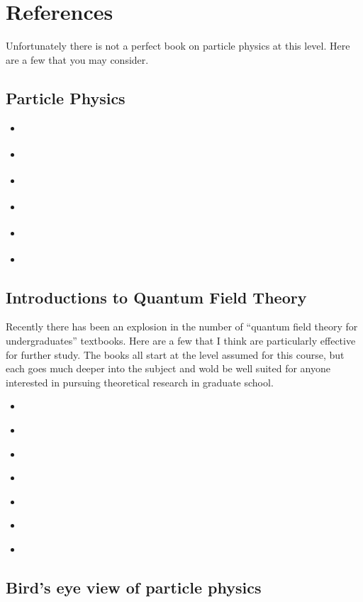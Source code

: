 \documentclass[12pt, oneside]{report}    %
\let\oldsection\section
\def\section{%
  \setcounter{sidenote}{1}%
  \oldsection
}
\begin{document}
\section{References}
Unfortunately there is not a perfect book on particle physics at this level. Here are a few that you may consider. 

\subsection{Particle Physics}
\begin{itemize}
    \item \cite{Griffiths:2008zz}
    \item \cite{Larkoski:2019jnv}
    \item \cite{Peskin:2019iig}
    \item \cite{Cahn:1989by}
    \item \cite{Goldberg:2017dlc}
    \item \cite{Bettini:2008zz}
\end{itemize}

\subsection{Introductions to Quantum Field Theory}
Recently there has been an explosion in the number of ``quantum field theory for undergraduates'' textbooks. Here are a few that I think are particularly effective for further study. The books all start at the level assumed for this course, but each goes much deeper into the subject and wold be well suited for anyone interested in pursuing theoretical research in graduate school.
\begin{itemize}
    \item \cite{Schwichtenberg:2018dri}
    \item \cite{schwichtenberg2020no}
    \item \cite{Lancaster:2014pza}
    \item \cite{donoghue2022prelude}
    \item \cite{Zee:2010qce}
    \item \cite{Feynman:1986er}
    \item \cite{Veltman:1994wz}
\end{itemize}

\subsection{Bird's eye view of particle physics}
\end{document}
